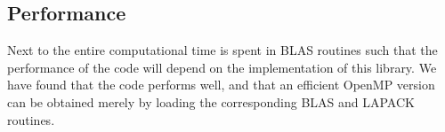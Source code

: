 
\subsection{Performance}

Next to the entire computational time is spent in BLAS routines such that the performance of the code will depend on the  implementation of this library. We have found that the code performs well, and that  an efficient  OpenMP  version  can be obtained merely by   loading the corresponding BLAS and LAPACK routines. 


